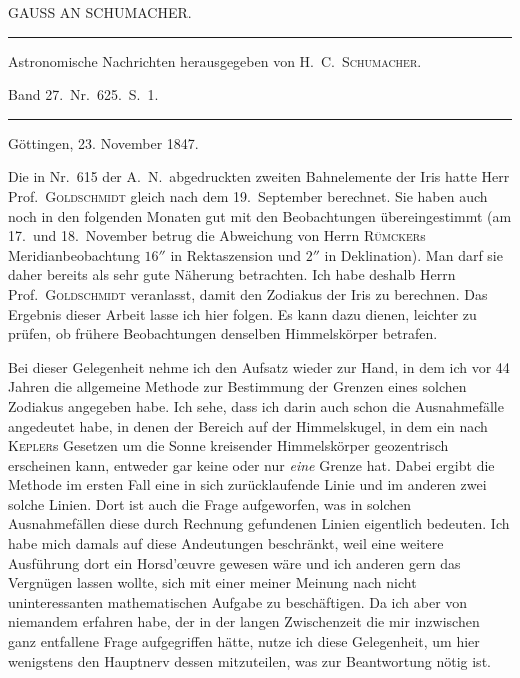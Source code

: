 \clearpage{}%
\begin{center}
{\small GAUSS AN SCHUMACHER.\par}
\medskip\hrule\medskip
{\small Astronomische Nachrichten herausgegeben von H.\ C.\ \textsc{Schumacher}.\par
Band 27.\ Nr.\ 625.\ S.\ 1.\par}
\medskip\hrule
\end{center}\medskip
\begin{flushright}Göttingen, 23. November 1847.\end{flushright}
Die in Nr.\ 615 der A.\ N.\ abgedruckten zweiten Bahnelemente der Iris hatte Herr Prof.\ \textsc{Goldschmidt} gleich nach dem 19.\ September berechnet. Sie haben auch noch in den folgenden Monaten gut mit den Beobachtungen übereingestimmt (am 17.\ und 18.\ November betrug die Abweichung von Herrn \textsc{Rümcker}s Meridianbeobachtung $16''$ in Rektaszension und $2''$ in Deklination). Man darf sie daher bereits als sehr gute Näherung betrachten. Ich habe deshalb Herrn Prof.\ \textsc{Goldschmidt} veranlasst, damit den Zodiakus der Iris zu berechnen. Das Ergebnis dieser Arbeit lasse ich hier folgen. Es kann dazu dienen, leichter zu prüfen, ob frühere Beobachtungen denselben Himmelskörper betrafen.

Bei dieser Gelegenheit nehme ich den Aufsatz wieder zur Hand, in dem ich vor 44 Jahren die allgemeine Methode zur Bestimmung der Grenzen eines solchen Zodiakus angegeben habe. Ich sehe, dass ich darin auch schon die Ausnahmefälle angedeutet habe, in denen der Bereich auf der Himmelskugel, in dem ein nach \textsc{Kepler}s Gesetzen um die Sonne kreisender Himmelskörper geozentrisch erscheinen kann, entweder gar keine oder nur \textit{eine} Grenze hat. Dabei ergibt die Methode im ersten Fall eine in sich zurücklaufende Linie und im anderen zwei solche Linien. Dort ist auch die Frage aufgeworfen, was in solchen Ausnahmefällen diese durch Rechnung gefundenen Linien eigentlich
%
bedeuten. Ich habe mich damals auf diese Andeutungen beschränkt, weil eine weitere Ausführung dort ein Horsd’œuvre gewesen wäre und ich anderen gern das Vergnügen lassen wollte, sich mit einer meiner Meinung nach nicht uninteressanten mathematischen Aufgabe zu beschäftigen. Da ich aber von niemandem erfahren habe, der in der langen Zwischenzeit die mir inzwischen ganz entfallene Frage aufgegriffen hätte, nutze ich diese Gelegenheit, um hier wenigstens den Hauptnerv dessen mitzuteilen, was zur Beantwortung nötig ist.

